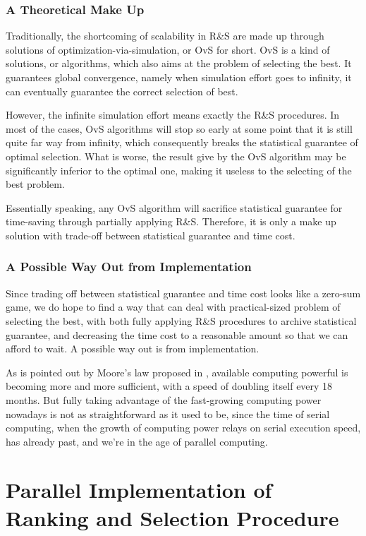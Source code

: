 \documentclass[12pt,a4paper]{report}
\begin{document}
\subsubsection{A Theoretical Make Up}

Traditionally, the shortcoming of scalability in R\&S are made up through solutions of optimization-via-simulation, or OvS for short. OvS is a kind of solutions, or algorithms, which also aims at the problem of selecting the best. It guarantees global convergence, namely when simulation effort goes to infinity, it can eventually guarantee the correct selection of best.

However, the infinite simulation effort means exactly the R\&S procedures. In most of the cases, OvS algorithms will stop so early at some point that it is still quite far way from infinity, which consequently breaks the statistical guarantee of optimal selection. What is worse, the result give by the OvS algorithm may be significantly inferior to the optimal one, making it useless to the selecting of the best problem. 

Essentially speaking, any OvS algorithm will sacrifice statistical guarantee for time-saving through partially applying R\&S. Therefore, it is only a make up solution with trade-off between statistical guarantee and time cost.

\subsubsection{A Possible Way Out from Implementation}

Since trading off between statistical guarantee and time cost looks like a zero-sum game, we do hope to find a way that can deal with practical-sized problem of selecting the best, with both fully applying R\&S procedures to archive statistical guarantee, and decreasing the time cost to a reasonable amount so that we can afford to wait. A possible way out is from implementation.

As is pointed out by Moore's law proposed in \cite{moore}, available computing powerful is becoming more and more sufficient, with a speed of doubling itself every 18 months. But fully taking advantage of the fast-growing computing power nowadays is not as straightforward as it used to be, since the time of serial computing, when the growth of computing power relays on serial execution speed, has already past, and we're in the age of parallel computing.

\section{Parallel Implementation of Ranking and Selection Procedure}
\end{document}

